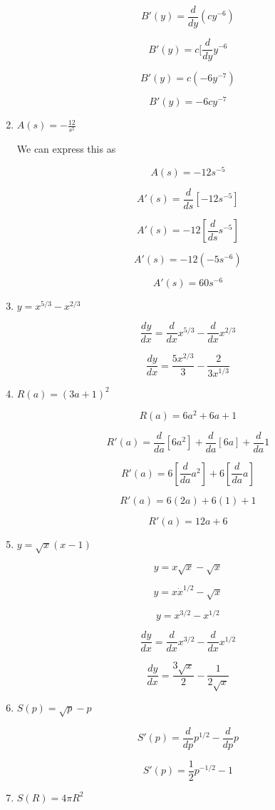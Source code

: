 \documentclass{article}
\begin{document}
\begin{enumerate}
			$$B'(y) = \frac{d}{dy} (cy^{-6})$$

			$$B'(y) = c [\frac{d}{dy} y^{-6}$$

			$$B'(y) = c(-6y^{-7})$$

			$$B'(y) = -6cy^{-7}$$

		\item $A(s) = - \frac{12}{s^{5}}$

			We can express this as 

			$$A(s) = - 12s^{-5}$$

			$$A'(s) = \frac{d}{ds} [-12s^{-5}]$$

			$$A'(s) = -12 [\frac{d}{ds} s^{-5}]$$

			$$A'(s) = -12 (-5 s^{-6})$$

			$$A'(s) = 60 s^{-6}$$

		\item $y = x^{5/3} - x^{2/3}$

			$$\frac{dy}{dx} = \frac{d}{dx} x^{5/3} - \frac{d}{dx} x^{2/3}$$

			$$\frac{dy}{dx} = \frac{5 x^{2/3}}{3} - \frac{2}{3x^{1/3}}$$

		\item $R(a) = (3a + 1)^2$

			$$R(a) = 6a^2 + 6a + 1$$

			$$R'(a) = \frac{d}{da} [6a^2] + \frac{d}{da} [6a] + \frac{d}{da} 1$$

			$$R'(a) = 6 [\frac{d}{da} a^2] + 6 [\frac{d}{da} a]$$

			$$R'(a) = 6 (2a) + 6 (1) + 1$$

			$$R'(a) = 12a + 6$$	

		\item $y = \sqrt{x}(x - 1)$

			$$y = x \sqrt{x} - \sqrt{x}$$

			$$y = x \dot x^{1/2} - \sqrt{x}$$

			$$y = x^{3/2} - x^{1/2}$$

			$$\frac{dy}{dx} = \frac{d}{dx} x^{3/2} - \frac{d}{dx} x^{1/2}$$

			$$\frac{dy}{dx} = \frac{3\sqrt{x}}{2} - \frac{1}{2\sqrt{x}}$$

		\item $S(p) = \sqrt{p} - p$

			$$S'(p) = \frac{d}{dp} p^{1/2} - \frac{d}{dp} p$$

			$$S'(p) = \frac{1}{2} p^{-1/2} - 1$$

		\item $S(R) = 4 \pi R^2$


\end{enumerate}
\end{document}
